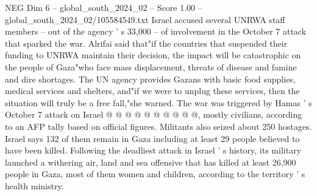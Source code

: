 \begin{textsample}{NEG Dim 6 – global\_south\_2024\_02 – Score 1.00 – global\_south\_2024\_02/105584549.txt}
Israel accused several UNRWA staff members -- out of the agency ' s 33,000 -- of involvement in the October 7 attack that sparked the war.
Alrifai said that"if the countries that suspended their funding to UNRWA maintain their decision, the impact will be catastrophic on the people of Gaza"who face mass displacement, threats of disease and famine and dire shortages.
The UN agency provides Gazans with basic food supplies, medical services and shelters, and"if we were to unplug these services, then the situation will truly be a free fall,"she warned.
The war was triggered by Hamas ' s October 7 attack on Israel @ @ @ @ @ @ @ @ @ @, mostly civilians, according to an AFP tally based on official figures.
Militants also seized about 250 hostages.
Israel says 132 of them remain in Gaza including at least 29 people believed to have been killed.
Following the deadliest attack in Israel ' s history, its military launched a withering air, land and sea offensive that has killed at least 26,900 people in Gaza, most of them women and children, according to the territory ' s health ministry.

\end{textsample}
